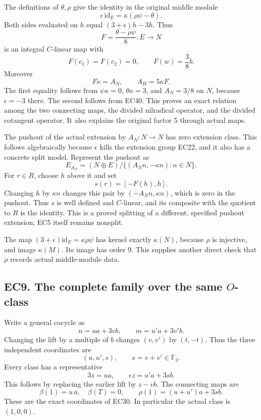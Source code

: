 \documentclass[
  10pt,
  a4paper,
]{article}
\begin{document}
The definitions of \(\theta,\rho\) give the identity in the original
middle module \[
\epsilon\,\mathrm{id}_E=\kappa(\rho\psi-\theta).
\tag{EC40}
\] Both sides evaluated on \(h\) equal \((3+\epsilon)h-3h\). Thus \[
F=\frac{\theta-\rho\psi}{8}:E\longrightarrow N
\] is an integral \(C\)-linear map with \[
F(c_1)=F(c_2)=0,\qquad F(w)=\frac38b.
\] Moreover \[
F\kappa=A_N,\qquad A_H=5\kappa F.
\tag{EC41}
\] The first equality follows from \(\psi\kappa=0\), \(\theta\kappa=3\),
and \(A_N=3/8\) on \(N\), because \(\epsilon=-3\) there. The second
follows from EC40. This proves an exact relation among the two
connecting maps, the divided nilradical operator, and the divided
cotangent operator. It also explains the original factor 5 through
actual maps.

The pushout of the actual extension by \(A_N:N\to N\) has zero extension
class. This follows algebraically because \(\epsilon\) kills the
extension group EC22, and it also has a concrete split model. Represent
the pushout as \[
E_{A_N}=(N\oplus E)/
\{(A_Nn,-\kappa n):n\in N\}.
\] For \(r\in R\), choose \(h\) above it and set \[
s(r)=[-F(h),h].
\tag{EC42}
\] Changing \(h\) by \(\kappa n\) changes this pair by
\((-A_Nn,\kappa n)\), which is zero in the pushout. Thus \(s\) is well
defined and \(C\)-linear, and its composite with the quotient to \(R\)
is the identity. This is a proved splitting of a different, specified
pushout extension; EC5 itself remains nonsplit.

The map \((3+\epsilon)\mathrm{id}_E=\kappa\rho\psi\) has kernel exactly
\(\kappa(N)\), because \(\rho\) is injective, and image \(\kappa(M)\).
Its image has order 9. This supplies another direct check that \(\rho\)
records actual middle-module data.

\subsection{\texorpdfstring{EC9. The complete family over the same
\(O\)-class}{EC9. The complete family over the same O-class}}\label{ec9.-the-complete-family-over-the-same-o-class}

Write a general cocycle as \[
n=u a+3v b,\qquad m=u'a+3v'b.
\] Changing the lift by a multiple of \(b\) changes \((v,v')\) by
\((t,-t)\). Thus the three independent coordinates are \[
(u,u',s),\qquad s=v+v'\in\mathbb F_3.
\tag{EC43}
\] Every class has a representative \[
3z=u a,\qquad
\epsilon z=u'a+3s b.
\tag{EC44}
\] This follows by replacing the earlier lift by \(z-vb\). The
connecting maps are \[
\beta(1)=u\,\overline a,\quad\beta(T)=0,\qquad
\rho(1)=(u+u')a+3s b.
\tag{EC45}
\] These are the exact coordinates of EC30. In particular the actual
class is \((1,0,0)\).
\end{document}

